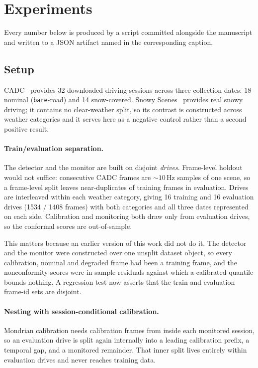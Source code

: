 \section{Experiments}
\label{sec:experiments}

Every number below is produced by a script committed alongside the
manuscript and written to a JSON artifact named in the corresponding
caption.

\subsection{Setup}
\label{sec:exp-setup}

CADC~\cite{Pitropov2021CADC} provides 32 downloaded driving sessions across
three collection dates: 18 nominal (\texttt{bare}-road) and 14
snow-covered. Snowy Scenes~\cite{SnowyScenes2026} provides real snowy
driving; it contains no clear-weather split, so its contrast is constructed
across weather categories and it serves here as a negative control rather
than a second positive result.

\paragraph{Train/evaluation separation.} The detector and the monitor are
built on disjoint \emph{drives}. Frame-level holdout would not suffice:
consecutive CADC frames are ${\sim}10$\,Hz samples of one scene, so a
frame-level split leaves near-duplicates of training frames in evaluation.
Drives are interleaved within each weather category, giving 16 training and
16 evaluation drives (1534 / 1408 frames) with both categories and all
three dates represented on each side. Calibration and monitoring both draw
only from evaluation drives, so the conformal scores are out-of-sample.

This matters because an earlier version of this work did not do it. The
detector and the monitor were constructed over one unsplit dataset object,
so every calibration, nominal and degraded frame had been a training frame,
and the nonconformity scores were in-sample residuals against which a
calibrated quantile bounds nothing. A regression test now asserts that the
train and evaluation frame-id sets are disjoint.

\paragraph{Nesting with session-conditional calibration.} Mondrian
calibration needs calibration frames from inside each monitored session, so
an evaluation drive is split again internally into a leading calibration
prefix, a temporal gap, and a monitored remainder. That inner split lives
entirely within evaluation drives and never reaches training data.

